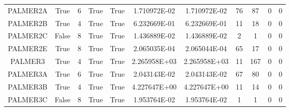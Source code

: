 \begin{longtable}{ccccccccccc}
	\cellcolor{default2} PALMER2A& \cellcolor{default2} True& \cellcolor{default2} 6& \cellcolor{default2} True& \cellcolor{default2} True& \cellcolor{best} 1.710972E-02& \cellcolor{ok} 1.710972E-02& \cellcolor{best} 76& \cellcolor{ok} 87& \cellcolor{default2} 0& \cellcolor{default2} 0\\
	\cellcolor{default1} PALMER2B& \cellcolor{default1} True& \cellcolor{default1} 4& \cellcolor{default1} True& \cellcolor{default1} True& \cellcolor{ok} 6.232669E-01& \cellcolor{best} 6.232669E-01& \cellcolor{best} 11& \cellcolor{ok} 18& \cellcolor{default1} 0& \cellcolor{default1} 0\\
	\cellcolor{default2} PALMER2C& \cellcolor{default2} False& \cellcolor{default2} 8& \cellcolor{default2} True& \cellcolor{default2} True& \cellcolor{best} 1.436889E-02& \cellcolor{ok} 1.436889E-02& \cellcolor{ok} 2& \cellcolor{best} 1& \cellcolor{default2} 0& \cellcolor{default2} 0\\
	\cellcolor{default1} PALMER2E& \cellcolor{default1} True& \cellcolor{default1} 8& \cellcolor{default1} True& \cellcolor{default1} True& \cellcolor{best} 2.065035E-04& \cellcolor{ok} 2.065044E-04& \cellcolor{poor} 65& \cellcolor{best} 17& \cellcolor{default1} 0& \cellcolor{default1} 0\\
	\cellcolor{default2} PALMER3& \cellcolor{default2} True& \cellcolor{default2} 4& \cellcolor{default2} True& \cellcolor{default2} True& \cellcolor{ok} 2.265958E+03& \cellcolor{best} 2.265958E+03& \cellcolor{best} 11& \cellcolor{poor} 167& \cellcolor{default2} 0& \cellcolor{default2} 0\\
	\cellcolor{default1} PALMER3A& \cellcolor{default1} True& \cellcolor{default1} 6& \cellcolor{default1} True& \cellcolor{default1} True& \cellcolor{best} 2.043143E-02& \cellcolor{ok} 2.043143E-02& \cellcolor{best} 67& \cellcolor{ok} 80& \cellcolor{default1} 0& \cellcolor{default1} 0\\
	\cellcolor{default2} PALMER3B& \cellcolor{default2} True& \cellcolor{default2} 4& \cellcolor{default2} True& \cellcolor{default2} True& \cellcolor{ok} 4.227647E+00& \cellcolor{best} 4.227647E+00& \cellcolor{best} 11& \cellcolor{ok} 14& \cellcolor{default2} 0& \cellcolor{default2} 0\\
	\cellcolor{default1} PALMER3C& \cellcolor{default1} False& \cellcolor{default1} 8& \cellcolor{default1} True& \cellcolor{default1} True& \cellcolor{best} 1.953764E-02& \cellcolor{ok} 1.953764E-02& \cellcolor{best} 1& \cellcolor{best} 1& \cellcolor{default1} 0& \cellcolor{default1} 0\\

\end{longtable}

